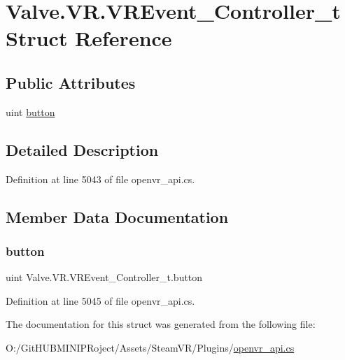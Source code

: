 \hypertarget{struct_valve_1_1_v_r_1_1_v_r_event___controller__t}{}\section{Valve.\+V\+R.\+V\+R\+Event\+\_\+\+Controller\+\_\+t Struct Reference}
\label{struct_valve_1_1_v_r_1_1_v_r_event___controller__t}
\subsection*{Public Attributes}
\begin{DoxyCompactItemize}
\item 
uint \mbox{\hyperlink{struct_valve_1_1_v_r_1_1_v_r_event___controller__t_a0eabbe47255efc128de8fd88a0d59032}{button}}
\end{DoxyCompactItemize}


\subsection{Detailed Description}


Definition at line 5043 of file openvr\+\_\+api.\+cs.



\subsection{Member Data Documentation}
\mbox{\label{struct_valve_1_1_v_r_1_1_v_r_event___controller__t_a0eabbe47255efc128de8fd88a0d59032}} 
\subsubsection{\texorpdfstring{button}{button}}
{\footnotesize\ttfamily uint Valve.\+V\+R.\+V\+R\+Event\+\_\+\+Controller\+\_\+t.\+button}



Definition at line 5045 of file openvr\+\_\+api.\+cs.



The documentation for this struct was generated from the following file\+:\begin{DoxyCompactItemize}
\item 
O\+:/\+Git\+H\+U\+B\+M\+I\+N\+I\+P\+Roject/\+Assets/\+Steam\+V\+R/\+Plugins/\mbox{\hyperlink{openvr__api_8cs}{openvr\+\_\+api.\+cs}}\end{DoxyCompactItemize}
